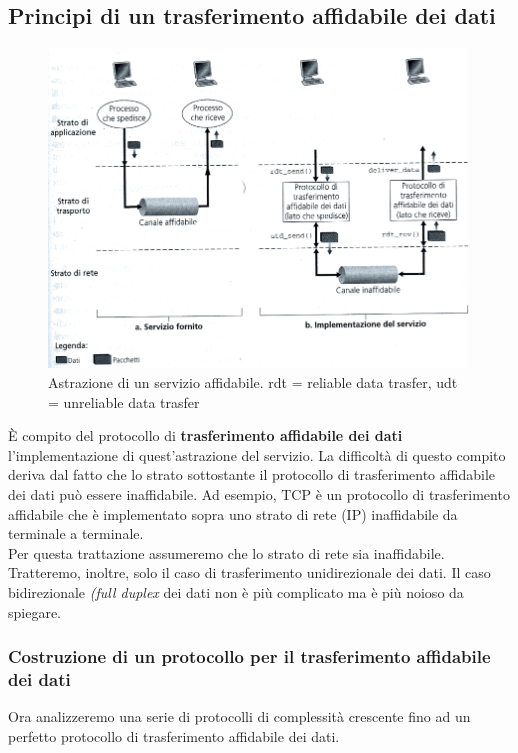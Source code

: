 \documentclass[11pt,a4paper]{article}
\begin{document}
\subsection{Principi di un trasferimento affidabile dei dati}
\begin{figure}
	\includegraphics[scale=0.6]{img/016.png}
	\caption{Astrazione di un servizio affidabile. rdt = reliable data trasfer, udt = unreliable data trasfer}
\end{figure}
È compito del protocollo di \textbf{trasferimento affidabile dei dati} l'implementazione di quest'astrazione del servizio. La difficoltà di questo compito deriva dal fatto che lo strato sottostante il protocollo di trasferimento affidabile dei dati può essere inaffidabile. Ad esempio, TCP è un protocollo di trasferimento affidabile che è implementato sopra uno strato di rete (IP) inaffidabile da terminale a terminale. \\
Per questa trattazione assumeremo che lo strato di rete sia inaffidabile. Tratteremo, inoltre, solo il caso di trasferimento unidirezionale dei dati. Il caso bidirezionale \textit{(full duplex} dei dati non è più complicato ma è più noioso da spiegare. \\
\subsubsection{Costruzione di un protocollo per il trasferimento affidabile dei dati}
Ora analizzeremo una serie di protocolli di complessità crescente fino ad un perfetto protocollo di trasferimento affidabile dei dati.
\end{document}
